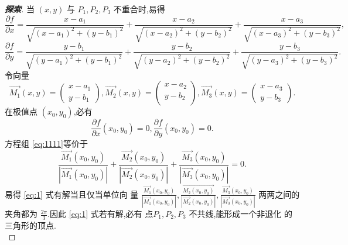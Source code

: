 \documentclass[a4paper]{article}
\newcommand{\pa}{\partial} \newcommand{\Om}{\Omega}
\begin{document}
\begin{proof}[\textbf{探索}]
当 $(x,y)$ 与 $P_1,P_2,P_3$ 不重合时,易得
$$
\frac{\pa f}{\pa
  x}=\frac{x-a_1}{\sqrt{(x-a_1)^2+(y-b_1)^2}}+\frac{x-a_2}{\sqrt{(x-a_2)^2+(y-b_2)^2}}+\frac{x-a_3}{\sqrt{(x-a_3)^2+(y-b_3)^2}},
$$
$$
\frac{\pa f}{\pa
  y}=\frac{y-b_1}{\sqrt{(y-a_1)^2+(y-b_1)^2}}+\frac{y-b_2}{\sqrt{(y-a_2)^2+(y-b_2)^2}}+\frac{y-b_3}{\sqrt{(y-a_3)^2+(y-b_3)^2}}.
$$
令向量
$$
\overrightarrow{M_{1}}(x,y)=\begin{pmatrix}
  x-a_1\\
  y-b_1
\end{pmatrix},\overrightarrow{M_{2}}(x,y)=\begin{pmatrix}
  x-a_2\\
  y-b_2\\
\end{pmatrix},\overrightarrow{M_3}(x,y)=\begin{pmatrix}
  x-a_3\\
  y-b_3
\end{pmatrix}.
$$
在极值点 $(x_0,y_0)$,必有
\begin{equation}
  \label{eq:1111}
  \frac{\pa f}{\pa x}(x_0,y_0)=0,\frac{\pa f}{\pa y}(x_0,y_0)=0.
\end{equation}
方程组 \eqref{eq:1111}等价于
\begin{equation}\label{eq:1}
  \frac{\overrightarrow{M_1}(x_0,y_0)}{|\overrightarrow{M_1}(x_0,y_0)|}+\frac{\overrightarrow{M_2}(x_0,y_0)}{|\overrightarrow{M_2}(x_0,y_0)|}+\frac{\overrightarrow{M_3}(x_0,y_0)}{|\overrightarrow{M_3}(x_0,y_0)|}=0.
\end{equation}
易得 \eqref{eq:1} 式有解当且仅当单位向
量
$\frac{\overrightarrow{M_1}(x_0,y_0)}{|\overrightarrow{M_1}(x_0,y_0)|},\frac{\overrightarrow{M_{2}(x_0,y_0)}}{|\overrightarrow{M_2}(x_0,y_0)|},\frac{\overrightarrow{M_{3}}(x_0,y_0)}{|\overrightarrow{M_3}(x_0,y_0)|}$
两两之间的夹角都为 $\frac{2\pi}{3}$.因此 \eqref{eq:1} 式若有解,必有
点$P_1,P_2,P_3$ 不共线,能形成一个非退化
的三角形的顶点.\\


\end{proof}
\end{document}
